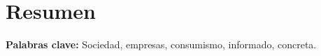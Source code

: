 \section*{Resumen}


\noindent\textbf{Palabras clave:} Sociedad, empresas, consumismo, informado, concreta.
